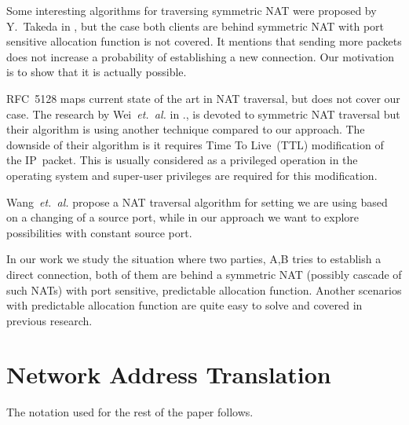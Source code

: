 \documentclass{llncs}
\begin{document}
Some interesting algorithms for traversing symmetric NAT were proposed by Y.~Takeda in \citep{takeda}, but the case both clients are behind symmetric NAT
with port sensitive allocation function is not covered. It mentions that sending more packets does not increase a probability of establishing a new connection.
Our motivation is to show that it is actually possible.

RFC~5128 \citep{rfc5128} maps current state of the art in NAT traversal, but does not cover our case. 
The research by Wei~\emph{et.~al.} in \citep{wei}., is devoted to symmetric NAT traversal but their algorithm is using another technique compared
to our approach. The downside of their algorithm is it requires Time To Live~(TTL) modification of the IP~packet. This is usually considered
as a privileged operation in the operating system and super-user privileges are required for this modification. 

Wang~\emph{et.~al.} \citep{Wang:2006:RSN:1156422.1156550} propose a NAT traversal algorithm for setting we are using based on
a changing of a source port, while in our approach we want to explore possibilities with constant source port.

In our work we study the situation where two parties, A,B tries to establish a direct connection, both of them are behind 
a symmetric NAT (possibly cascade of such NATs) with port sensitive, predictable allocation function. Another scenarios with
predictable allocation function are quite easy to solve and covered in previous research. 

\section{Network Address Translation}
The notation used for the rest of the paper follows.

\end{document}
